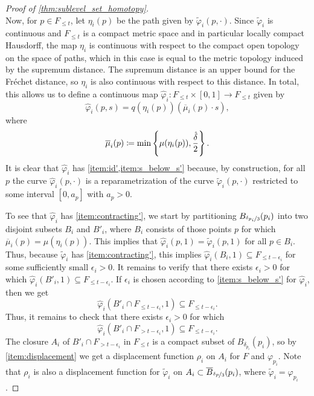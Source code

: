 \begin{proof}[Proof of \cref{thm:sublevel_set_homotopy}]
\begin{equation}
	\end{equation}
	Now, for $p \in F_{\leq t}$, let $\eta_{i}(p)$ be the path given by $\tilde{\varphi}_{i}(p,\cdot)$.
	Since $\tilde{\varphi}_{i}$ is continuous and $F_{\leq t}$ is a compact metric space and in particular locally compact Hausdorff, the map $\eta_{i}$ is continuous with respect to the compact open topology on the space of paths, which in this case is equal to the metric topology induced by the supremum distance.
	The supremum distance is an upper bound for the Fr\'echet distance, so $\eta_{i}$ is also continuous with respect to this distance.
	In total, this allows us to define a continuous map $\hat{\varphi}_{i} \colon F_{\leq t} \times [0,1] \to F_{\leq t}$ given by
	\[
	\hat{\varphi}_{i}(p,s) = q(\eta_{i}(p))(\overline{\mu}_{i}(p)\cdot s),
	\]
	where
	\[
	\overline{\mu}_{i}(p) \coloneqq \min \left\{ \mu(\eta_{i}(p)), \frac{\hat{\delta}}{2} \right\}.
	\]
	It is clear that $\hat{\varphi}_{i}$ has \cref{item:id',item:s_below_s'} because, by construction, for all $p$ the curve $\hat{\varphi}_{i}(p,\cdot)$ is a reparametrization of the  curve $\tilde{\varphi}_{i}(p,\cdot)$ restricted to some interval $[0,a_p]$ with $a_p >0$.

	To see that $\hat{\varphi}_{i}$ has \cref{item:contracting'}, we start by partitioning $B_{\nicefrac{\delta_{p_{i}}}{3}}(p_{i})$ into two disjoint subsets $B_{i}$ and $B'_{i}$,
	 where $B_{i}$ consists of those points $p$ for which $\overline{\mu}_{i}(p) = \mu(\eta_{i}(p))$.
	 This implies that $\hat{\varphi}_{i}(p,1) = \tilde{\varphi}_{i}(p,1)$ for all $p \in B_{i}$.
	Thus, because $\tilde{\varphi}_{i}$ has \cref{item:contracting'}, this implies
	$\hat{\varphi}_{i}(B_{i}, 1) \subseteq F_{\leq t - \epsilon_i}$ for some sufficiently small $\epsilon_i > 0$.
	It remains to verify that there exists $\epsilon_{i} > 0$ for which $\hat{\varphi}_{i}(B'_{i},1) \subseteq F_{\leq t-\epsilon_{i}}$.
%
%
%
	If $\epsilon_{i}$ is chosen according to \cref{item:s_below_s'} for $\hat{\varphi}_{i}$, then we get \[\hat{\varphi}_{i}(B'_{i} \cap F_{\leq t-\epsilon_{i}},1) \subseteq F_{\leq t-\epsilon_{i}}.\]
	Thus, it remains to check that there exists $\epsilon_{i} > 0$ for which \[\hat{\varphi}_{i}(B'_{i} \cap F_{> t-\epsilon_{i}},1) \subseteq F_{\leq t-\epsilon_{i}}.\]
	The closure $A_{i}$ of $B'_{i} \cap F_{> t-\epsilon_{i}}$ in $F_{\leq t}$ is a compact subset of $B_{\delta_{p_{i}}}(p_{i})$, so by \cref{item:displacement} we get a displacement function $\rho_{i}$ on $A_{i}$ for $F$ and $\varphi_{p_{i}}$.
	Note that $\rho_{i}$ is also a displacement function for $\tilde{\varphi}_{i}$ on $A_{i} \subset \overline{B}_{\nicefrac{\delta_{p}}{3}}(p_i)$, where $\tilde{\varphi}_{i} = \varphi_{p_{i}}$.


\end{proof}
